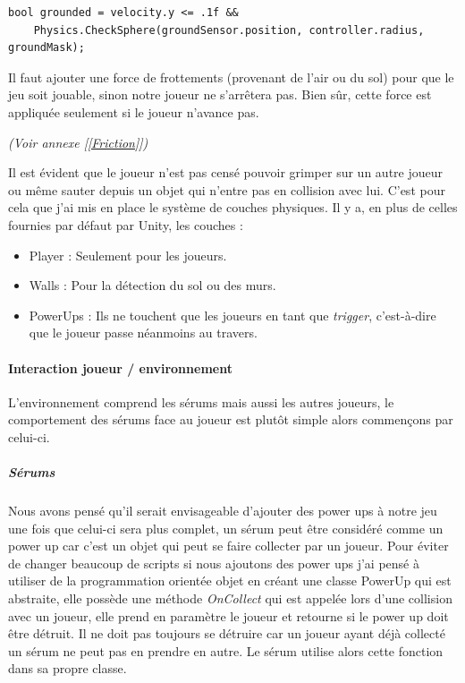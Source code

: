 \documentclass{article}
\begin{document}
\begin{lstlisting}
bool grounded = velocity.y <= .1f &&
	Physics.CheckSphere(groundSensor.position, controller.radius, groundMask);
\end{lstlisting}

Il faut ajouter une force de frottements (provenant de l'air ou du sol) pour que le jeu soit jouable, sinon notre joueur ne s'arrêtera pas. Bien sûr, cette force est appliquée seulement si le joueur n'avance pas.

\emph{(Voir annexe [\ref{Friction}])}

Il est évident que le joueur n'est pas censé pouvoir grimper sur un autre joueur ou même sauter depuis un objet qui n'entre pas en collision avec lui. C'est pour cela que j'ai mis en place le système de couches physiques. Il y a, en plus de celles fournies par défaut par Unity, les couches :

\begin{itemize}
\item Player : Seulement pour les joueurs.

\item Walls : Pour la détection du sol ou des murs.

\item PowerUps : Ils ne touchent que les joueurs en tant que \emph{trigger}, c'est-à-dire que le joueur passe néanmoins au travers.
\end{itemize}

\paragraph{Interaction joueur / environnement}

L'environnement comprend les sérums mais aussi les autres joueurs, le comportement des sérums face au joueur est plutôt simple alors commençons par celui-ci.

\subparagraph{Sérums}

Nous avons pensé qu'il serait envisageable d'ajouter des power ups à notre jeu une fois que celui-ci sera plus complet, un sérum peut être considéré comme un power up car c'est un objet qui peut se faire collecter par un joueur. Pour éviter de changer beaucoup de scripts si nous ajoutons des power ups j'ai pensé à utiliser de la programmation orientée objet en créant une classe PowerUp qui est abstraite, elle possède une méthode \emph{OnCollect} qui est appelée lors d'une collision avec un joueur, elle prend en paramètre le joueur et retourne si le power up doit être détruit. Il ne doit pas toujours se détruire car un joueur ayant déjà collecté un sérum ne peut pas en prendre en autre. Le sérum utilise alors cette fonction dans sa propre classe.
\end{document}
